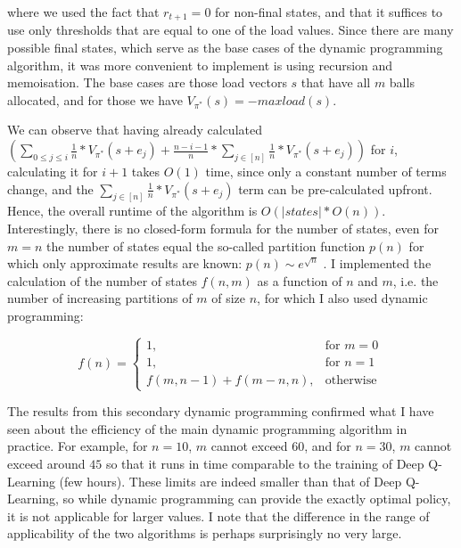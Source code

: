 where we used the fact that $r_{t+1}=0$ for non-final states, and that it suffices to use only thresholds that are equal to one of the load values. Since there are many possible final states, which serve as the base cases of the dynamic programming algorithm, it was more convenient to implement is using recursion and memoisation. The base cases are those load vectors $s$ that have all $m$ balls allocated, and for those we have $V_{\pi^*}(s)=-maxload(s)$. 


We can observe that having already calculated $(\sum_{0\leq j \leq i} \frac{1}{n}*V_{\pi^*}(s+e_j) + \frac{n-i-1}{n} * \sum_{j \in [n]} \frac{1}{n}*V_{\pi^*}(s+e_j))$ for $i$, calculating it for $i+1$ takes $O(1)$ time, since only a constant number of terms change, and the $\sum_{j \in [n]} \frac{1}{n}*V_{\pi^*}(s+e_j)$ term can be pre-calculated upfront. Hence, the overall runtime of the algorithm is $O(|states|*O(n))$. Interestingly, there is no closed-form formula for the number of states, even for $m=n$ the number of states equal the so-called partition function $p(n)$ for which only approximate results are known: $p(n) \sim e^{\sqrt{n}}$ \cite{hardy1918partitionfunction}. I implemented the calculation of the number of states $f(n, m)$ as a function of $n$ and $m$, i.e. the number of increasing partitions of $m$ of size $n$, for which I also used dynamic programming:


\begin{equation} \label{eq: numberofpartitions}
    f(n) = \begin{cases}
        1, & \text{for } m=0\\
        1, & \text{for } n=1\\
        f(m,n-1)+f(m-n,n), & \text{otherwise }
    \end{cases}
\end{equation}


The results from this secondary dynamic programming confirmed what I have seen about the efficiency of the main dynamic programming algorithm in practice. For example, for $n=10$, $m$ cannot exceed $60$, and for $n=30$, $m$ cannot exceed around $45$ so that it runs in time comparable to the training of Deep Q-Learning (few hours). These limits are indeed smaller than that of Deep Q-Learning, so while dynamic programming can provide the exactly optimal policy, it is not applicable for larger values. I note that the difference in the range of applicability of the two algorithms is perhaps surprisingly no very large. 


